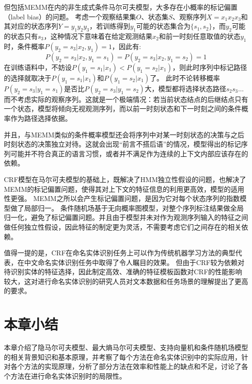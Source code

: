 但包括MEMM在内的非生成式条件马尔可夫模型，大多存在小概率的标记偏置（label bias）的问题。
考虑一个观察结果集$O$、状态集$S$、观察序列$X = x_1x_2x_3$和其对应的状态序列$Y = y_1y_2y_3$，若训练得到$y_1$可能的状态集合为$\{s_1, s_2\}$，而$y_2$可能的状态只有$s_3$，这种情况下意味着在给定观测结果$x_2$和前一时刻任意取值的状态$y_1$时，条件概率$P(y_2 = s_3|x_2, y_1) = 1$，因此有:
\begin{equation}
    P(y_2 = s_3|x_2, y_1 = s_1) = P(y_2 = s_3|x_2, y_1 = s_2) = 1
\end{equation}
在训练语料中，不妨设$P(y_1 = s_1|x_1) < P(y_1 = s_2|x_1)$，则此时序列中标记路径的选择就取决于$P(y_1 = s_1|x_1)$和$P(y_1 = s_2|x_1)$了。
此时不论转移概率$P(y_2 = s_3|y_1 = s_1)$是否比$P(y_2 = s_3|y_1 = s_2)$大，模型都将选择状态路径$s_2s_3\dots$而不考虑实际的观察序列。这就是一个极端情况：若当前状态结点的后继结点只有一个状态，模型将倾向无视观测序列，而以前一时刻状态和下一时刻之间的条件概率作为路径选择依据。

并且，与MEMM类似的条件概率模型还会将序列中对某一时刻状态的决策与之后时刻状态的决策独立对待。这就会出现“前言不搭后语”的情况，模型得出的标记序列可能并不符合真正的语言习惯，或者并不满足作为连续的上下文内部应该存在的依赖。

CRF模型在马尔可夫模型的基础上，既解决了HMM独立性假设的问题，也解决了MEMM的标记偏置问题，使得其对上下文的特征信息的利用更高效，模型的适用性更强。
MEMM之所以会产生标记偏置问题，是因为它对每个状态序列的指数模型做了局部归一。
条件随机场基于无向概率图模型，对整个序列标注结果做全局归一化，避免了标记偏置问题。并且由于模型并未对作为观测序列输入的特征之间做任何独立性假设，因此特征的制定更为灵活，不需要考虑它们之间存在的相关依赖。

值得一提的是，CRF在命名实体识别任务上可以作为传统机器学习方法的典型代表，在中文命名实体识别任务中取得了令人瞩目的效果。
但由于CRF较为依赖对待识别实体的特征选择，因此制定高效、准确的特征模板函数对CRF的性能影响较大，这对进行命名实体识别的研究人员对文本数据和任务场景的理解提出了更高的要求。

\section{本章小结}
本章介绍了隐马尔可夫模型、最大熵马尔可夫模型、支持向量机和条件随机场模型的相关背景知识和基本原理，并考察了每个方法在命名实体识别中的实际应用，针对各个方法的实现原理，分析了部分方法在效率和性能上的缺点和不足，讨论了各个方法在进行命名实体识别时的局限性。

